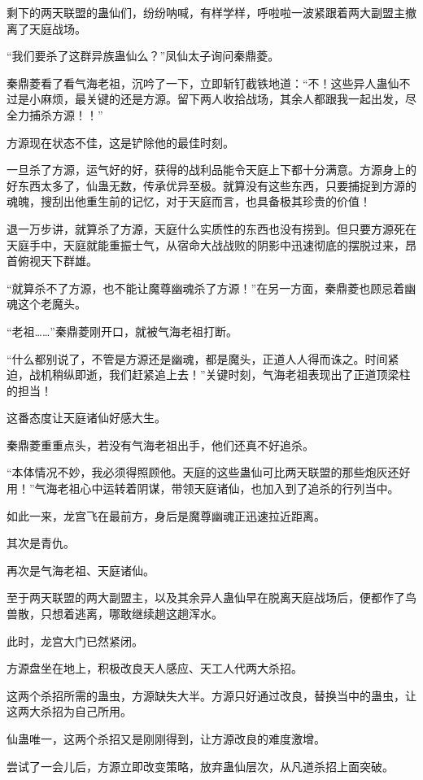 \begin{this_body}
剩下的两天联盟的蛊仙们，纷纷呐喊，有样学样，呼啦啦一波紧跟着两大副盟主撤离了天庭战场。

“我们要杀了这群异族蛊仙么？”凤仙太子询问秦鼎菱。

秦鼎菱看了看气海老祖，沉吟了一下，立即斩钉截铁地道：“不！这些异人蛊仙不过是小麻烦，最关键的还是方源。留下两人收拾战场，其余人都跟我一起出发，尽全力捕杀方源！！”

方源现在状态不佳，这是铲除他的最佳时刻。

一旦杀了方源，运气好的好，获得的战利品能令天庭上下都十分满意。方源身上的好东西太多了，仙蛊无数，传承优异至极。就算没有这些东西，只要捕捉到方源的魂魄，搜刮出他重生前的记忆，对于天庭而言，也具备极其珍贵的价值！

退一万步讲，就算杀了方源，天庭什么实质性的东西也没有捞到。但只要方源死在天庭手中，天庭就能重振士气，从宿命大战战败的阴影中迅速彻底的摆脱过来，昂首俯视天下群雄。

“就算杀不了方源，也不能让魔尊幽魂杀了方源！”在另一方面，秦鼎菱也顾忌着幽魂这个老魔头。

“老祖……”秦鼎菱刚开口，就被气海老祖打断。

“什么都别说了，不管是方源还是幽魂，都是魔头，正道人人得而诛之。时间紧迫，战机稍纵即逝，我们赶紧追上去！”关键时刻，气海老祖表现出了正道顶梁柱的担当！

这番态度让天庭诸仙好感大生。

秦鼎菱重重点头，若没有气海老祖出手，他们还真不好追杀。

“本体情况不妙，我必须得照顾他。天庭的这些蛊仙可比两天联盟的那些炮灰还好用！”气海老祖心中运转着阴谋，带领天庭诸仙，也加入到了追杀的行列当中。

如此一来，龙宫飞在最前方，身后是魔尊幽魂正迅速拉近距离。

其次是青仇。

再次是气海老祖、天庭诸仙。

至于两天联盟的两大副盟主，以及其余异人蛊仙早在脱离天庭战场后，便都作了鸟兽散，只想着逃离，哪敢继续趟这趟浑水。

此时，龙宫大门已然紧闭。

方源盘坐在地上，积极改良天人感应、天工人代两大杀招。

这两个杀招所需的蛊虫，方源缺失大半。方源只好通过改良，替换当中的蛊虫，让这两大杀招为自己所用。

仙蛊唯一，这两个杀招又是刚刚得到，让方源改良的难度激增。

尝试了一会儿后，方源立即改变策略，放弃蛊仙层次，从凡道杀招上面突破。


\end{this_body}
